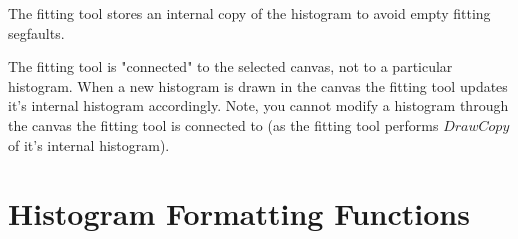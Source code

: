 \documentclass[a4paper,10pt]{article}
\begin{document}
The fitting tool stores an internal copy of the histogram to avoid empty fitting segfaults.

The fitting tool is "connected" to the selected canvas, not to a particular histogram. When a new histogram is drawn in the canvas the fitting tool updates it's internal histogram accordingly. Note, you cannot modify a histogram through the canvas the fitting tool is connected to (as the fitting tool performs $DrawCopy$ of it's internal histogram).

\section{Histogram Formatting Functions}
\end{document}
